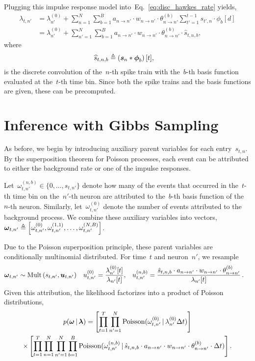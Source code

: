 Plugging this impulse response model
into~Eq.~\ref{eq:disc_hawkes_rate} yields,
\begin{align*}
  \lambda_{t,n'} &=
  \lambda_{n'}^{(0)} +
  \sum_{n = 1}^N  \sum_{b=1}^B a_{n \to n'} \cdot w_{n \to n'} \cdot 
  \theta_{n \to n'}^{(b)} \sum_{t'=1}^{t-1} s_{t',n} \cdot \phi_b[d] \\
  &=
  \lambda_{n'}^{(0)} +
  \sum_{n' = 1}^N  \sum_{b=1}^B a_{n \to n'} \cdot w_{n \to n'} \cdot
  \theta_{n \to n'}^{(b)} \cdot  \widehat{s}_{t,n,b},
\end{align*}
where
\begin{align*}
  \widehat{s}_{t,n,b} &\triangleq \left(\boldsymbol{s}_n \ast \boldsymbol{\phi}_b\right)[t],
\end{align*}
is the discrete convolution of the~$n$-th spike train with
the~$b$-th basis function evaluated at the~$t$-th time bin.
Since both the spike trains and the basis functions are given,
these can be precomputed.


\section{Inference with Gibbs Sampling}

As before, we begin by introducing auxiliary parent variables for each
entry~$s_{t,n}$.  By the superposition theorem for Poisson processes,
each event can be attributed to either the background rate or one of
the impulse responses.

Let~${\omega_{t,n'}^{(n,b)} \in \{0,\ldots, s_{t,n'}\}}$ denote how
many of the events that occurred in the~$t$-th time bin on the~$n'$-th
neuron are attributed to the~$b$-th basis function of the~$n$-th
neuron.  Similarly, let~${\omega_{t,n'}^{(0)}}$ denote the number of
events attributed to the background process. We combine these
auxiliary variables into vectors,~${\boldsymbol{\omega}_{t,n'}\triangleq
  \left[\omega_{t,n'}^{(0)}, \omega_{t,n'}^{(1,1)}, \ldots,
    \omega_{t,n'}^{(N,B)} \right]}$.

Due to the Poisson superposition principle, these parent variables are
conditionally multinomial distributed.  For time~$t$ and neuron~$n'$,
we resample
\begin{align*}
\boldsymbol{\omega}_{t,n'} &\sim \mathrm{Mult} \left(s_{t,n'}, \boldsymbol{u}_{t,n'} \right) & 
u_{t,n'}^{(0)} &= \frac{\lambda_{n'}^{(0)}[t]}{\lambda_{n'}[t]}, &
u_{t,n'}^{(n,b)} &= \frac{\hat{s}_{t,n,b} \cdot a_{n \to n'} \cdot w_{n \to n'} \cdot \theta_{n \to n'}^{(b)}}{\lambda_{n'}[t]}\, .
\end{align*}
Given this attribution, the likelihood factorizes into a product of
Poisson distributions,
\begin{multline*}
  p(\boldsymbol{\omega} \,|\, \boldsymbol{\lambda}) =
  \left[\prod_{t=1}^T \prod_{n'=1}^N \mathrm{Poisson}(\omega_{t,n'}^{(0)} \,|\, \lambda_{n'}^{(0)} \Delta t)\right]  \\
  \times
  \left[ \prod_{t=1}^T \prod_{n=1}^N \prod_{n'=1}^N \prod_{b=1}^B
    \mathrm{Poisson}(\omega_{t,n'}^{(n,b)} \,|\,
    \hat{s}_{t,n,b} \cdot a_{n \to n'} \cdot w_{n \to n'} \cdot \theta_{n\to n'}^{(b)} \cdot \Delta t)\right].
\end{multline*}

